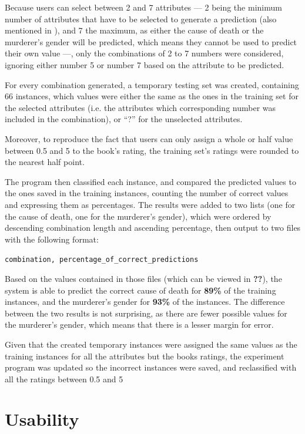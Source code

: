 \documentclass{mproj}
\begin{document}
Because users can select between 2 and 7 attributes --- 2 being the minimum number of attributes that have to be selected to generate a prediction (also mentioned in ), and 7 the maximum, as either the cause of death or the murderer's gender will be predicted, which means they cannot be used to predict their own value ---, only the combinations of 2 to 7 numbers were considered, ignoring either number 5 or number 7 based on the attribute to be predicted.

For every combination generated, a temporary testing set was created, containing 66 instances, which values were either the same as the ones in the training set for the selected attributes (i.e. the attributes which corresponding number was included in the combination), or ``?'' for the unselected attributes.

Moreover, to reproduce the fact that users can only assign a whole or half value between 0.5 and 5 to the book's rating, the training set's ratings were rounded to the nearest half point.

The program then classified each instance, and compared the predicted values to the ones saved in the training instances, counting the number of correct values and expressing them as percentages. The results were added to two lists (one for the cause of death, one for the murderer's gender), which were ordered by descending combination length and ascending percentage, then output to two files with the following format: 
\begin{center}
	\vspace{-5mm}
	\verb|combination, percentage_of_correct_predictions|
\end{center}

Based on the values contained in those files (which can be viewed in \textbf{??}), the system is able to predict the correct cause of death for \textbf{89\%} of the training instances, and the murderer's gender for \textbf{93\%} of the instances. The difference between the two results is not surprising, as there are fewer possible values for the murderer's gender, which means that there is a lesser margin for error.

Given that the created temporary instances were assigned the same values as the training instances for all the attributes but the books ratings, the experiment program was updated so the incorrect instances were saved, and reclassified with all the ratings between 0.5 and 5


\section{Usability}
\end{document}
